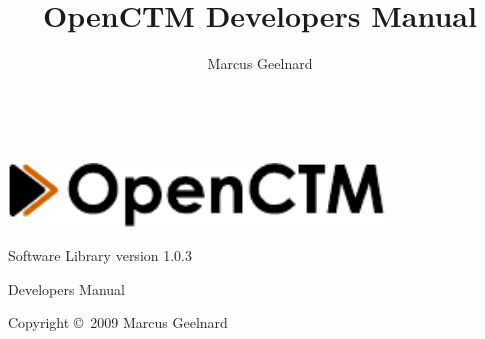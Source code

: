 %
%



\author{Marcus Geelnard}
\title{OpenCTM Developers Manual}





\begin{titlepage}
\begin{center}
~
\vspace{5cm}

\includegraphics[width=10.0cm]{logo.pdf}
\vspace{0.4cm}

{\large Software Library version 1.0.3}

\vspace{1.0cm}

{\Large Developers Manual}
\vspace{1.5cm}

Copyright \copyright \ 2009 Marcus Geelnard
\end{center}
\end{titlepage}



